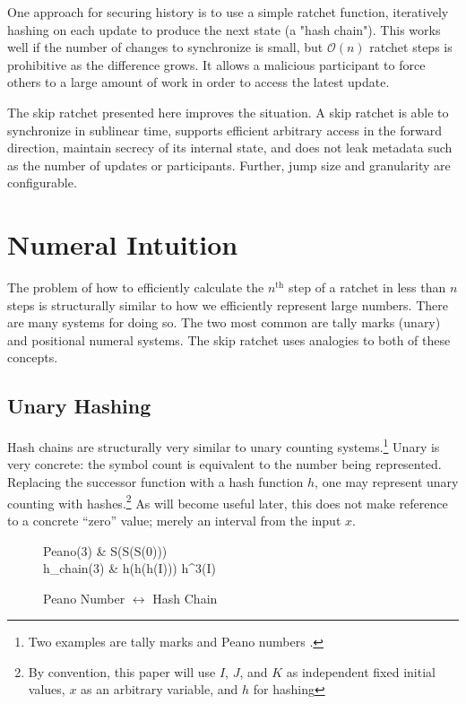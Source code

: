 \documentclass[twocolumn]{article}
\begin{document}
    One approach for securing history is to use a simple ratchet function, iteratively hashing on each update to produce the next state (a "hash chain"). This works well if the number of changes to synchronize is small, but $\mathcal{O}(n)$ ratchet steps is prohibitive as the difference grows. It allows a malicious participant to force others to a large amount of work in order to access the latest update.
    
    The skip ratchet presented here improves the situation. A skip ratchet is able to synchronize in sublinear time, supports efficient arbitrary access in the forward direction, maintain secrecy of its internal state, and does not leak metadata such as the number of updates or participants. Further, jump size and granularity are configurable.
    
    \section{Numeral Intuition}
    
    The problem of how to efficiently calculate the $n^{\text{th}}$ step of a ratchet in less than $n$ steps is structurally similar to how we efficiently represent large numbers. There are many systems for doing so. The two most common are tally marks (unary) and positional numeral systems. The skip ratchet uses analogies to both of these concepts.
    
	\subsection{Unary Hashing}

	Hash chains are structurally very similar to unary counting systems.\footnote{Two examples are tally marks and Peano numbers \cite{peano-wikipedia}.} Unary is very concrete: the symbol count is equivalent to the number being represented. Replacing the successor function with a hash function $h$, one may represent unary counting with hashes.\footnote{By convention, this paper will use $I$, $J$, and $K$ as independent fixed initial values, $x$ as an arbitrary variable, and $h$ for hashing} As will become useful later, this does not make reference to a concrete ``zero'' value; merely an interval from the input $x$.
	
    \begin{figure}[h]
		\centering
		
		\begin{flalign}
			Peano(3) & \Rightarrow S(S(S(0))) \nonumber \\
			h_{chain}(3)  & \Rightarrow h(h(h(I))) \equiv h^{3}(I) \nonumber 
		\end{flalign}
	
		\caption{Peano Number $\leftrightarrow$ Hash Chain}
		\label{fig:peano-hash-equiv}
	\end{figure}
    
\end{document}
